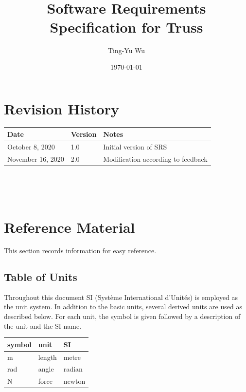 \documentclass[12pt]{article}
\begin{document}
\title{Software Requirements Specification for Truss} 
\author{Ting-Yu Wu}
\date{\today}
	
\maketitle

\section*{Revision History}

\begin{tabularx}{\textwidth}{p{3.5cm}p{2cm}X}
	\toprule {\bf Date} & {\bf Version} & {\bf Notes}\\
	\midrule
	October 8, 2020 & 1.0 & Initial version of SRS\\
	November 16, 2020 & 2.0 & Modification according to feedback\\
	\bottomrule
\end{tabularx}

~\newpage


\tableofcontents

~\newpage

\section{Reference Material}

This section records information for easy reference.

\subsection{Table of Units}

Throughout this document SI (Syst\`{e}me International d'Unit\'{e}s) is employed
as the unit system.  In addition to the basic units, several derived units are
used as described below.  For each unit, the symbol is given followed by a
description of the unit and the SI name.
~\newline

\renewcommand{\arraystretch}{1.2}
  \noindent \begin{tabular}{l l l} 
    \toprule		
    \textbf{symbol} & \textbf{unit} & \textbf{SI}\\
    \midrule 
    \si{\metre} & length & metre\\
    \si{\radian} & angle & radian\\
    \si{\newton} & force & newton\\
    \bottomrule
  \end{tabular}
\end{document}
